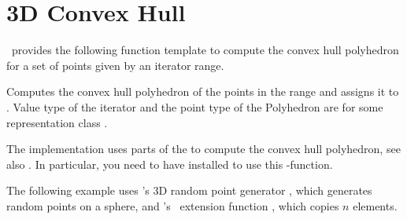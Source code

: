\newpage
\section{3D Convex Hull}
\cgal\ provides the following function template to compute the convex hull polyhedron
for a set of points given by an iterator range.


{Computes the convex hull polyhedron of the points in the range \ccc{[first,beyond)} and
 assigns it to .
 \ccPrecond Value type of the iterator and the point type of 
 the Polyhedron are  for some representation class .}


\ccImplementation
The implementation uses parts of the 
to compute the convex hull polyhedron, see also \cite{mmnssuz-cbhdc-97}.
In particular, you need to have  installed 
to use this \cgal-function.


\ccExample

The following example uses \cgal's 3D random point generator
, which generates random points
on a sphere, and \cgal's \stl\ extension function , which 
copies $n$ elements.

